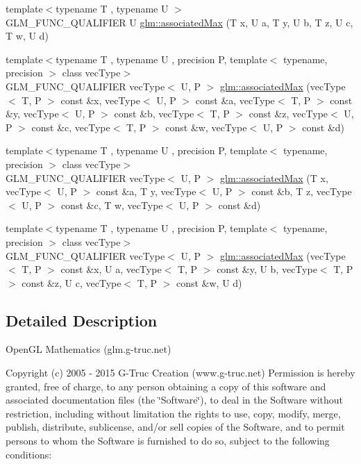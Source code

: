 \begin{DoxyCompactItemize}
\item 
{\footnotesize template$<$typename T , typename U $>$ }\\G\+L\+M\+\_\+\+F\+U\+N\+C\+\_\+\+Q\+U\+A\+L\+I\+F\+I\+E\+R U \hyperlink{group__gtx__associated__min__max_ga3038ffcb43eaa6af75897a99a5047ccc}{glm\+::associated\+Max} (T x, U a, T y, U b, T z, U c, T w, U d)
\item 
{\footnotesize template$<$typename T , typename U , precision P, template$<$ typename, precision $>$ class vec\+Type$>$ }\\G\+L\+M\+\_\+\+F\+U\+N\+C\+\_\+\+Q\+U\+A\+L\+I\+F\+I\+E\+R vec\+Type$<$ U, P $>$ \hyperlink{group__gtx__associated__min__max_gaf607886421c35cd7e4f41a50d7c330e3}{glm\+::associated\+Max} (vec\+Type$<$ T, P $>$ const \&x, vec\+Type$<$ U, P $>$ const \&a, vec\+Type$<$ T, P $>$ const \&y, vec\+Type$<$ U, P $>$ const \&b, vec\+Type$<$ T, P $>$ const \&z, vec\+Type$<$ U, P $>$ const \&c, vec\+Type$<$ T, P $>$ const \&w, vec\+Type$<$ U, P $>$ const \&d)
\item 
{\footnotesize template$<$typename T , typename U , precision P, template$<$ typename, precision $>$ class vec\+Type$>$ }\\G\+L\+M\+\_\+\+F\+U\+N\+C\+\_\+\+Q\+U\+A\+L\+I\+F\+I\+E\+R vec\+Type$<$ U, P $>$ \hyperlink{group__gtx__associated__min__max_ga7a165de1af9a3f9193516a3b47407086}{glm\+::associated\+Max} (T x, vec\+Type$<$ U, P $>$ const \&a, T y, vec\+Type$<$ U, P $>$ const \&b, T z, vec\+Type$<$ U, P $>$ const \&c, T w, vec\+Type$<$ U, P $>$ const \&d)
\item 
{\footnotesize template$<$typename T , typename U , precision P, template$<$ typename, precision $>$ class vec\+Type$>$ }\\G\+L\+M\+\_\+\+F\+U\+N\+C\+\_\+\+Q\+U\+A\+L\+I\+F\+I\+E\+R vec\+Type$<$ U, P $>$ \hyperlink{group__gtx__associated__min__max_ga3122fbe8133ea54749b10fb93e8a167e}{glm\+::associated\+Max} (vec\+Type$<$ T, P $>$ const \&x, U a, vec\+Type$<$ T, P $>$ const \&y, U b, vec\+Type$<$ T, P $>$ const \&z, U c, vec\+Type$<$ T, P $>$ const \&w, U d)
\end{DoxyCompactItemize}


\subsection{Detailed Description}
Open\+G\+L Mathematics (glm.\+g-\/truc.\+net)

Copyright (c) 2005 -\/ 2015 G-\/\+Truc Creation (www.\+g-\/truc.\+net) Permission is hereby granted, free of charge, to any person obtaining a copy of this software and associated documentation files (the \char`\"{}\+Software\char`\"{}), to deal in the Software without restriction, including without limitation the rights to use, copy, modify, merge, publish, distribute, sublicense, and/or sell copies of the Software, and to permit persons to whom the Software is furnished to do so, subject to the following conditions\+:

